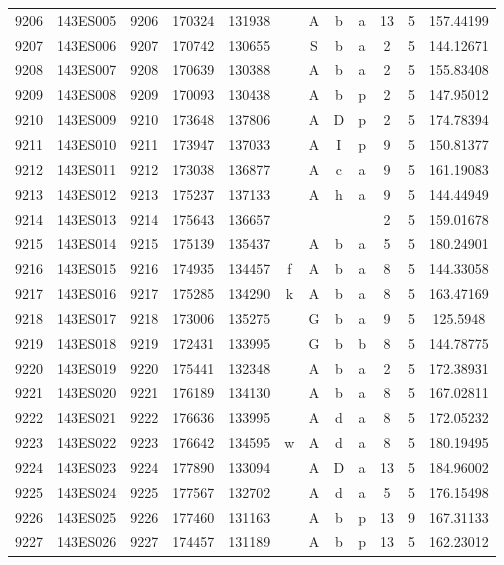 \begin{tabular}{|*{12}{c|}}
9206 & 143ES005 & 9206 & 170324 & 131938 &  & A & b & a & 13 & 5 & 157.44199 \\ 
9207 & 143ES006 & 9207 & 170742 & 130655 &  & S & b & a & 2 & 5 & 144.12671 \\ 
9208 & 143ES007 & 9208 & 170639 & 130388 &  & A & b & a & 2 & 5 & 155.83408 \\ 
9209 & 143ES008 & 9209 & 170093 & 130438 &  & A & b & p & 2 & 5 & 147.95012 \\ 
9210 & 143ES009 & 9210 & 173648 & 137806 &  & A & D & p & 2 & 5 & 174.78394 \\ 
9211 & 143ES010 & 9211 & 173947 & 137033 &  & A & I & p & 9 & 5 & 150.81377 \\ 
9212 & 143ES011 & 9212 & 173038 & 136877 &  & A & c & a & 9 & 5 & 161.19083 \\ 
9213 & 143ES012 & 9213 & 175237 & 137133 &  & A & h & a & 9 & 5 & 144.44949 \\ 
9214 & 143ES013 & 9214 & 175643 & 136657 &  &  &  &  & 2 & 5 & 159.01678 \\ 
9215 & 143ES014 & 9215 & 175139 & 135437 &  & A & b & a & 5 & 5 & 180.24901 \\ 
9216 & 143ES015 & 9216 & 174935 & 134457 & f & A & b & a & 8 & 5 & 144.33058 \\ 
9217 & 143ES016 & 9217 & 175285 & 134290 & k & A & b & a & 8 & 5 & 163.47169 \\ 
9218 & 143ES017 & 9218 & 173006 & 135275 &  & G & b & a & 9 & 5 & 125.5948 \\ 
9219 & 143ES018 & 9219 & 172431 & 133995 &  & G & b & b & 8 & 5 & 144.78775 \\ 
9220 & 143ES019 & 9220 & 175441 & 132348 &  & A & b & a & 2 & 5 & 172.38931 \\ 
9221 & 143ES020 & 9221 & 176189 & 134130 &  & A & b & a & 8 & 5 & 167.02811 \\ 
9222 & 143ES021 & 9222 & 176636 & 133995 &  & A & d & a & 8 & 5 & 172.05232 \\ 
9223 & 143ES022 & 9223 & 176642 & 134595 & w & A & d & a & 8 & 5 & 180.19495 \\ 
9224 & 143ES023 & 9224 & 177890 & 133094 &  & A & D & a & 13 & 5 & 184.96002 \\ 
9225 & 143ES024 & 9225 & 177567 & 132702 &  & A & d & a & 5 & 5 & 176.15498 \\ 
9226 & 143ES025 & 9226 & 177460 & 131163 &  & A & b & p & 13 & 9 & 167.31133 \\ 
9227 & 143ES026 & 9227 & 174457 & 131189 &  & A & b & p & 13 & 5 & 162.23012 \\ 

\end{tabular}
